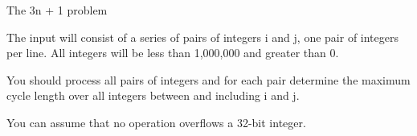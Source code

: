 The 3n + 1 problem

The input will consist of a series of pairs of integers i and  j, one pair of integers per line. All integers will be less than  1,000,000 and greater than 0.

You should process all pairs of integers and for each pair determine the maximum cycle length over all integers between and including i and  j.

You can assume that no operation overflows a 32-bit integer.